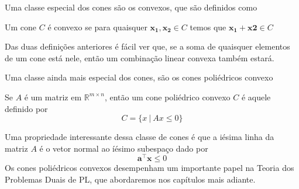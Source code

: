 Uma classe especial dos cones são os convexos, que são definidos como

\begin{def:cone convexo}
	Um cone $C$ é convexo se para quaisquer $\mathbf{x_1, x_2} \in C$ temos que $\mathbf{x_1} + \mathbf{x2} \in C$
\end{def:cone convexo}

Das duas definições anteriores é fácil ver que, se a soma de quaisquer elementos de um cone está nele, então um combinação linear convexa também estará.

Uma classe ainda mais especial dos cones, são os cones poliédricos convexo

\begin{def:cpc}
	Se $A$ é um matriz em $\mathbb{R}^{m\times n}$, então um cone poliédrico convexo $C$ é aquele definido por
	\begin{equation*}
		C = \{x\ |\ Ax \leq 0\}
	\end{equation*}  
\end{def:cpc}

Uma propriedade interessante dessa classe de cones é que a iésima linha da matriz $A$ é o vetor normal ao íésimo subespaço dado por \[\mathbf{a^\intercal x} \leq 0\]Os cones poliédricos convexos desempenham um importante papel na Teoria dos Problemas Duais de PL, que abordaremos nos capítulos mais adiante.

